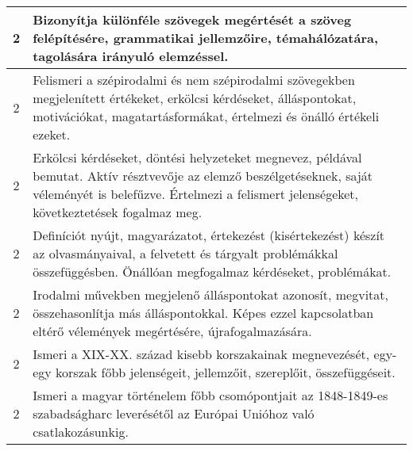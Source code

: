 \begin{longtable}{c | p{12cm} }
                                
                                          2 &  Bizonyítja különféle szövegek megértését a szöveg felépítésére, grammatikai jellemzőire, témahálózatára, tagolására irányuló elemzéssel. \\ \hline
                                          2 &  Felismeri a szépirodalmi és nem szépirodalmi szövegekben megjelenített értékeket, erkölcsi kérdéseket, álláspontokat, motivációkat, magatartásformákat, értelmezi és önálló értékeli ezeket. \\ \hline
                                          2 &  Erkölcsi kérdéseket, döntési helyzeteket megnevez, példával bemutat. Aktív résztvevője az elemző beszélgetéseknek, saját véleményét is belefűzve. Értelmezi a felismert jelenségeket, következtetések fogalmaz meg. \\ \hline
                                          2 &  Definíciót nyújt, magyarázatot, értekezést (kisértekezést) készít az olvasmányaival, a felvetett  és tárgyalt problémákkal összefüggésben. Önállóan megfogalmaz kérdéseket, problémákat. \\ \hline
                                          2 &  Irodalmi művekben megjelenő álláspontokat azonosít, megvitat, összehasonlítja más álláspontokkal. Képes ezzel kapcsolatban eltérő vélemények megértésére, újrafogalmazására. \\ \hline
                                          2 &  Ismeri a XIX-XX. század kisebb korszakainak megnevezését, egy-egy korszak főbb jelenségeit, jellemzőit, szereplőit, összefüggéseit. \\ \hline
                                          2 &  Ismeri a magyar történelem főbb csomópontjait az 1848-1849-es szabadságharc leverésétől az Európai Unióhoz való csatlakozásunkig. \\ \hline
                                      

\end{longtable}
